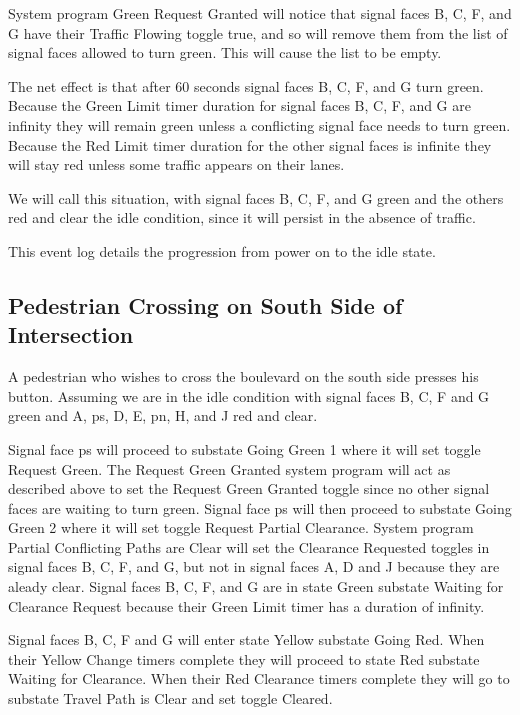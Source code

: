 \documentclass[letterpaper,twoside]{article}
\begin{document}
System program Green Request Granted will notice that signal faces
B, C, F, and G have their Traffic Flowing toggle true,
and so will remove them from the list of signal faces allowed to turn green.
This will cause the list to be empty.

The net effect is that after 60 seconds signal faces
B, C, F, and G turn green.  Because the Green Limit timer duration for signal
faces B, C, F, and G are infinity they will remain green unless
a conflicting signal face needs to turn green.  Because the Red Limit
timer duration for the other signal faces is infinite they will stay red
unless some traffic appears on their lanes.

We will call this situation, with signal faces B, C, F, and G green
and the others red and clear the idle condition, since it will persist
in the absence of traffic.

This event log details the progression from power on to the idle state.



\subsection{Pedestrian Crossing on South Side of Intersection}
A pedestrian who wishes to cross the boulevard on the south side
presses his button.  Assuming we are in the idle condition
with signal faces
B, C, F and G green and A, ps, D, E, pn, H, and J red and clear.

Signal face ps will proceed to substate Going Green 1 where it will set
toggle Request Green.  The Request Green Granted system program will act
as described above to set the Request Green Granted toggle since no other
signal faces are waiting to turn green.  Signal face ps will then
proceed to substate Going Green 2 where it will set toggle Request Partial
Clearance.  System program Partial Conflicting Paths are Clear will set
the Clearance Requested toggles in signal faces B, C, F, and G,
but not in signal faces A, D and J because they are aleady clear.
Signal faces B, C, F, and G are in state Green substate Waiting for Clearance
Request because their Green Limit timer has a duration of infinity.

Signal faces B, C, F and G will enter state Yellow substate Going Red.
When their Yellow Change timers complete they will proceed to state Red
substate Waiting for Clearance.
When their Red Clearance timers complete they will go
to substate Travel Path is Clear and set toggle Cleared.
\end{document}
